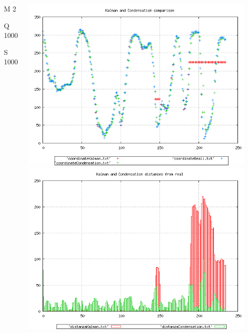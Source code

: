 \documentclass{beamer}
\begin{document}
{\begin{columns}
\begin{scriptsize}
\begin{itemize}
\item [M]2
\item [Q]1000
\item [S]1000
\end{itemize}
\end{scriptsize}
\includegraphics[scale=0.1]{../esperimenti/tappeto_nozoom/mod_2-Q_1000-S_1000/plot.png}\\
\includegraphics[scale=0.1]{../esperimenti/tappeto_nozoom/mod_2-Q_1000-S_1000/plot-distances.png}



\end{columns}}
\end{document}
